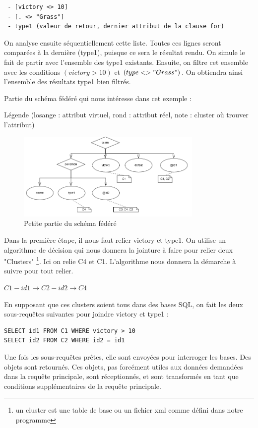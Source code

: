 \begin{lstlisting}
 - [victory <> 10]
 - [. <> "Grass"]
 - type1 (valeur de retour, dernier attribut de la clause for)
\end{lstlisting}

On analyse ensuite séquentiellement cette liste. Toutes ces lignes seront comparées à la dernière (type1), puisque ce sera le résultat rendu. On simule le fait de partir avec l'ensemble des type1 existants. Ensuite, on filtre cet ensemble avec les conditions $(victory > 10)$ et $(type <> "Grass")$. On obtiendra ainsi l'ensemble des résultats type1 bien filtrés.

Partie du schéma fédéré qui nous intéresse dans cet exemple :

Légende (losange : attribut virtuel, rond : attribut réel, note : cluster où trouver l'attribut)

\begin{figure}[h!]
    \centering
    \includegraphics[width=0.8\textwidth]{ressources/graphiques/decision.png}
    \caption{Petite partie du schéma fédéré}
\end{figure}

Dans la première étape, il nous faut relier victory et type1. On utilise un algorithme de décision qui nous donnera la jointure à faire pour relier deux "Clusters" \footnote{un cluster est une table de base ou un fichier xml  comme défini dans notre programme}. Ici on relie C4 et C1. L'algorithme nous donnera la démarche à suivre pour tout relier.


$C1 -id1 \rightarrow C2 -id2 \rightarrow  C4$

En supposant que ces clusters soient tous dans des bases SQL, on fait les deux sous-requêtes suivantes pour joindre victory et type1 :

\begin{lstlisting}
SELECT id1 FROM C1 WHERE victory > 10
SELECT id2 FROM C2 WHERE id2 = id1
\end{lstlisting}

Une fois les sous-requêtes prêtes, elle sont envoyées pour interroger les bases. Des objets sont retournés. Ces objets, pas forcément utiles aux données demandées dans la requête principale, sont réceptionnés, et sont transformés en tant que conditions supplémentaires de la requête principale.

